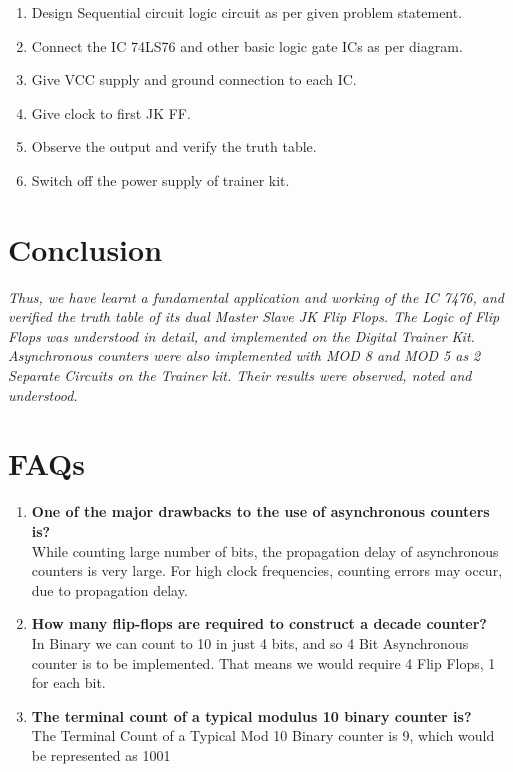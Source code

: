 \documentclass[11pt]{article}
\begin{document}
\begin{enumerate}
	\item Design Sequential circuit logic circuit as per given problem statement.
	\item Connect the IC 74LS76 and other basic logic gate ICs as per diagram.
	\item Give VCC supply and ground connection to each IC.
	\item Give clock to first JK FF.
	\item Observe the output and verify the truth table.
	\item Switch off the power supply of trainer kit.
\end{enumerate}

\section{Conclusion}
\textit{Thus, we have learnt a fundamental application and working of the IC 7476, and verified the truth table of its dual Master Slave JK Flip Flops. The Logic of Flip Flops was understood in detail, and implemented on the Digital Trainer Kit. Asynchronous counters were also implemented with MOD 8 and MOD 5 as 2 Separate Circuits on the Trainer kit. Their results were observed, noted and understood. }
\pagebreak

\section{FAQs}

\begin{enumerate}
	\item \textbf{One of the major drawbacks to the use of asynchronous counters is?}\\
	While counting large number of bits, the propagation delay of asynchronous counters is very large.	For high clock frequencies, counting errors may occur, due to propagation delay.	
	\item \textbf{How many flip-flops are required to construct a decade counter?}\\
	In Binary we can count to 10 in just 4 bits, and so 4 Bit Asynchronous counter is to be implemented. That means we would require 4 Flip Flops, 1 for each bit. 
	\item \textbf{The terminal count of a typical modulus 10 binary counter is?}\\
	The Terminal Count of a Typical Mod 10 Binary counter is 9, which would be represented as 1001
\end{enumerate}
\end{document}
